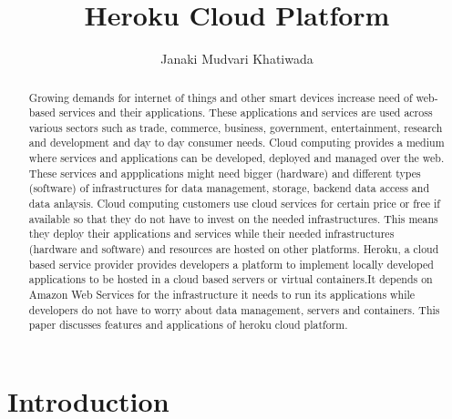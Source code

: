 
\title{Heroku Cloud Platform}


\author{Janaki Mudvari Khatiwada}


\renewcommand{\shortauthors}{J. M. Khatiwada}


\begin{abstract}
 Growing demands for internet of things and other smart devices increase
 need of web-based services and their applications. These applications and
 services are  used across various sectors such as trade, commerce, business,
 government, entertainment, research and development and day to day
 consumer needs. Cloud computing provides a medium where services and
 applications can be developed, deployed and managed over the web. These 
 services and appplications might need bigger (hardware) and different types
 (software) of infrastructures for data management, storage, backend data 
 access and data anlaysis. Cloud computing customers use cloud services
 for certain price or free if available so that they do not have to invest
 on the needed infrastructures. This means they deploy their applications and
 services while their needed infrastructures (hardware and software) and
 resources are hosted on other platforms. Heroku, a cloud based service provider
 provides developers a platform to implement
 locally developed applications to be hosted in a cloud based servers or
 virtual containers.It depends on Amazon Web Services for the infrastructure
 it needs to run its applications while developers do not have to worry about
 data management, servers and containers. This paper discusses features and
 applications of heroku cloud platform.
\end{abstract}



\maketitle



\section{Introduction}

